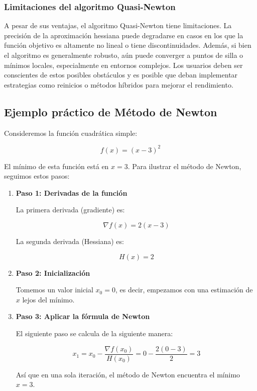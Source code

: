 \documentclass{article}
\begin{document}
	\subsubsection{Limitaciones del algoritmo Quasi-Newton}
	
	A pesar de sus ventajas, el algoritmo Quasi-Newton tiene limitaciones. La precisión de la aproximación hessiana puede degradarse en casos en los que la función objetivo es altamente no lineal o tiene discontinuidades. Además, si bien el algoritmo es generalmente robusto, aún puede converger a puntos de silla o mínimos locales, especialmente en entornos complejos. Los usuarios deben ser conscientes de estos posibles obstáculos y es posible que deban implementar estrategias como reinicios o métodos híbridos para mejorar el rendimiento.
	
	\subsection{Ejemplo práctico de Método de Newton}
	
	Consideremos la función cuadrática simple:
	
	\[
	f(x) = (x - 3)^2
	\]
	
	El mínimo de esta función está en \( x = 3 \). Para ilustrar el método de Newton, seguimos estos pasos:
	
	\begin{enumerate}
		\item \textbf{Paso 1: Derivadas de la función}
		
		La primera derivada (gradiente) es:
		
		\[
		\nabla f(x) = 2(x - 3)
		\]
		
		La segunda derivada (Hessiana) es:
		
		\[
		H(x) = 2
		\]
		
		\item \textbf{Paso 2: Inicialización}
		
		Tomemos un valor inicial \( x_0 = 0 \), es decir, empezamos con una estimación de \( x \) lejos del mínimo.
		
		\item \textbf{Paso 3: Aplicar la fórmula de Newton}
		
		El siguiente paso se calcula de la siguiente manera:
		
		\[
	    x_1 = x_0 - \frac{\nabla f(x_0)}{H(x_0)} = 0 - \frac{2(0 - 3)}{2} = 3
	    \]
	
	Así que en una sola iteración, el método de Newton encuentra el mínimo \( x = 3 \).
	\end{enumerate}
	
\end{document}
